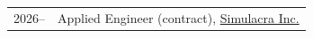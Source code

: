 
\begin{longtable}[l]{@{}p{} p{}}

    2026-- & Applied Engineer (contract), \href{https://www.simulacra.co.jp/about/}{Simulacra Inc.} \\

\end{longtable}
